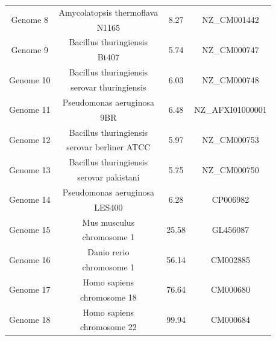 \documentclass[preprint,12pt]{elsarticle}
\begin{document}
\begin{table}[!thpb]
\begin{tabular}{c  c  c c}
\multirow{2}{*}{Genome 8}&Amycolatopsis thermoflava&  \multirow{2}{*}{8.27} &\multirow{2}{*}{NZ\_CM001442}\\   &N1165 & \\
\hline

\multirow{2}{*}{Genome 9}&Bacillus thuringiensis&   \multirow{2}{*}{5.74} &\multirow{2}{*}{ NZ\_CM000747 }\\    &Bt407&\\
\hline    

\multirow{2}{*}{Genome 10}&Bacillus thuringiensis& \multirow{2}{*}{6.03} &\multirow{2}{*}{ NZ\_CM000748}\\    &serovar thuringiensis& \\
\hline
    
\multirow{2}{*}{Genome 11}&Pseudomonas aeruginosa& \multirow{2}{*}{6.48} &\multirow{2}{*}{NZ\_AFXI01000001}\\    &9BR&\\
\hline
    
\multirow{2}{*}{Genome 12}&Bacillus thuringiensis&  \multirow{2}{*}{5.97} &\multirow{2}{*}{ NZ\_CM000753}\\    &serovar berliner ATCC &\\
\hline
    
\multirow{2}{*}{Genome 13}&Bacillus thuringiensis& \multirow{2}{*}{5.75} &\multirow{2}{*}{ NZ\_CM000750 }\\    &serovar pakistani&\\
\hline
    
\multirow{2}{*}{Genome 14}&Pseudomonas aeruginosa& \multirow{2}{*}{6.28} &\multirow{2}{*}{CP006982}\\    &LES400&\\
\hline

\multirow{2}{*}{Genome 15}& Mus musculus & \multirow{2}{*}{25.58} &\multirow{2}{*}{GL456087}\\  &chromosome 1&\\
\hline

\multirow{2}{*}{Genome 16}& Danio rerio & \multirow{2}{*}{56.14} &\multirow{2}{*}{CM002885}\\ & chromosome 1 &\\
\hline
\multirow{2}{*}{Genome 17}&Homo sapiens & \multirow{2}{*}{76.64 } &\multirow{2}{*}{  CM000680  }\\    & chromosome 18 &\\
\hline
\multirow{2}{*}{Genome 18}&Homo sapiens & \multirow{2}{*}{99.94} &\multirow{2}{*}{CM000684   }\\ & chromosome 22&\\
\hline
\end{tabular}
\end{table} 
\end{document}
